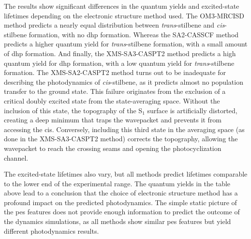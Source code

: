 The results show significant differences in the quantum yields and excited-state lifetimes depending on the electronic structure method used. The OM3-MRCISD method predicts a nearly equal distribution between \textit{trans}-stilbene and \textit{cis}-stilbene formation, with no \acrshort{dhp} formation. Whereas the SA2-CASSCF method predicts a higher quantum yield for \textit{trans}-stilbene formation, with a small amount of \acrshort{dhp} formation. And finally, the XMS-SA3-CASPT2 method predicts a high quantum yield for \acrshort{dhp} formation, with a low quantum yield for \textit{trans}-stilbene formation. The XMS-SA2-CASPT2 method turns out to be inadequate for describing the photodynamics of \textit{cis}-stilbene, as it predicts almost no population transfer to the ground state. This failure originates from the exclusion of a critical doubly excited state from the state-averaging space. Without the inclusion of this state, the topography of the S$_1$ surface is artificially distorted, creating a deep minimum that traps the wavepacket and prevents it from accessing the \glspl{ci}. Conversely, including this third state in the averaging space (as done in the XMS-SA3-CASPT2 method) corrects the topography, allowing the wavepacket to reach the crossing seams and opening the photocyclization channel.

The excited-state lifetimes also vary, but all methods predict lifetimes comparable to the lower end of the experimental range. The quantum yields in the table above lead to a conclusion that the choice of electronic structure method has a profound impact on the predicted photodynamics. The simple static picture of the \acrshort{pes} features does not provide enough information to predict the outcome of the dynamics simulations, as all methods show similar \acrshort{pes} features but yield different photodynamics results.
